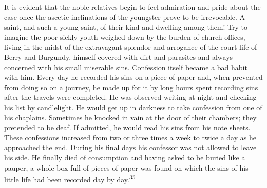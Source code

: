 It is evident that the noble relatives begin to feel admiration and
pride about the case once the ascetic inclinations of the youngster
prove to be irrevocable. A saint, and such a young saint, of their kind
and dwelling among them! Try to imagine the poor sickly youth weighed
down by the burden of church offices, living in the midst of the
extravagant splendor and arrogance of the court life of Berry and
Burgundy, himself covered with dirt and parasites and always concerned
with his small miserable sins. Confession itself became a bad habit with
him. Every day he recorded his sins on a piece of paper and, when
prevented from doing so on a journey, he made up for it by long hours
spent recording sins after the travels were completed. He was observed
writing at night and checking his list by candlelight. He would get up
in darkness to take confession from one of his chaplains. Sometimes he
knocked in vain at the door of their chambers; they pretended to be
deaf. If admitted, he would read his sins from his note sheets. These
confessions increased from two or three times a week to twice a day as
he approached the end. During his final days his confessor was not
allowed to leave his side. He finally died of consumption and having
asked to be buried like a pauper, a whole box full of pieces of paper
was found on which the sins of his little life had been recorded day by
day.\textsuperscript{\protect\hypertarget{14_Chapter_Seven__THE_PIOUS_PERSONA.xhtmlux5cux23id_954}{\protect\hyperlink{23_NOTES.xhtmlux5cux23id_955}{35}}}

